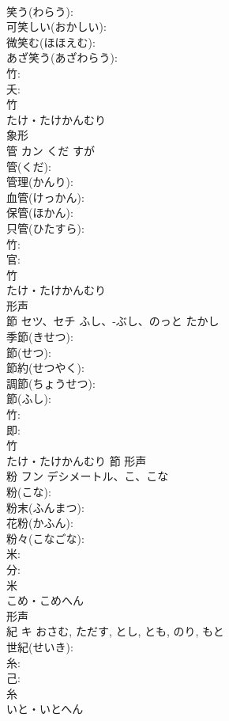 \documentclass[8pt]{extreport}
\begin{document}
\begin{CJK}{UTF8}{min}
\\	笑う(わらう): 
\\	可笑しい(おかしい): 
\\	微笑む(ほほえむ): 
\\	あざ笑う(あざわらう): 
\\	竹: 
\\	夭: 
\\	竹	
\\	たけ・たけかんむり	
\\	象形 
\\	管	カン	くだ	すが	
\\	管(くだ): 
\\	管理(かんり): 
\\	血管(けっかん): 
\\	保管(ほかん): 
\\	只管(ひたすら): 
\\	竹: 
\\	官: 
\\	竹	
\\	たけ・たけかんむり	
\\	形声 
\\	節	セツ、セチ	ふし、-ぶし、のっと	たかし	
\\	季節(きせつ): 
\\	節(せつ): 
\\	節約(せつやく): 
\\	調節(ちょうせつ): 
\\	節(ふし): 
\\	竹: 
\\	即: 
\\	竹	
\\	たけ・たけかんむり	節	形声 
\\	粉	フン	デシメートル、こ、こな		
\\	粉(こな): 
\\	粉末(ふんまつ): 
\\	花粉(かふん): 
\\	粉々(こなごな): 
\\	米: 
\\	分: 
\\	米	
\\	こめ・こめへん	
\\	形声 
\\	紀	キ		おさむ, ただす, とし, とも, のり, もと	
\\	世紀(せいき): 
\\	糸: 
\\	己: 
\\	糸	
\\	いと・いとへん	

\end{CJK}
\end{document}
